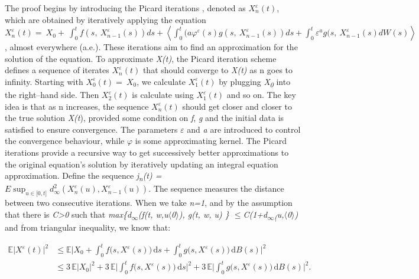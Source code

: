 \documentclass[12pt,a4paper]{report}
\numberwithin{equation}{section}
\begin{document}
The proof begins by introducing the Picard iterations \cite{llendeto2007modeling_82}, denoted
as \(X_{n}^{\varepsilon}(t)\), which are obtained by iteratively
applying the equation
\(X_{n}^{\varepsilon}(t) = \ X_{0} + \ \int_{0}^{t}{f\left( s,\ X_{n - 1}^{\varepsilon}(s) \right)ds + \left\langle \int_{0}^{t}{(a\varphi^{\varepsilon}(s)g\left( s,\ X_{n - 1}^{\varepsilon}(s) \right)ds + \int_{0}^{t}{\varepsilon^{a}g(s,\ X_{n - 1}^{\varepsilon}(s)
dW(s)}} \right\rangle}\),
almost everywhere (a.e.). These iterations aim to find an approximation
for the solution of the equation. To approximate \emph{X(t)}, the Picard
iteration scheme defines a sequence of iterates
\(X_{n}^{\varepsilon}(t)\) that should converge to \emph{X(t)} as n goes
to infinity. Starting with \(X_{0}^{\varepsilon}(t) = \ X_{0}\), we
calculate \(X_{1}^{\varepsilon}(t)\) by plugging
\emph{X\textsubscript{0}} into the right--hand side. Then
\(X_{2}^{\varepsilon}(t)\) is calculate using \(X_{1}^{\varepsilon}(t)\)
and so on. The key idea is that as n increases, the sequence
\(X_{n}^{\varepsilon}(t)\) should get closer and closer to the true
solution \emph{X(t}), provided some condition on \emph{f}, \emph{g} and
the initial data is satisfied to ensure convergence. The parameters
\emph{$\varepsilon$} and \emph{a} are introduced to control the convergence
behaviour, while \emph{$\varphi$} is some approximating kernel. The Picard
iterations provide a recursive way to get successively better
approximations to the original equation's solution by iteratively
updating an integral equation approximation. Define the sequence
\emph{j\textsubscript{n}(t) =}
\(E\sup_{u \in \lbrack 0,t\rbrack}{d_{\infty}^{2}(X_{n}^{\varepsilon}(u),X_{n - 1}^{\varepsilon}(u))}\)\emph{.}
The sequence measures the distance between two consecutive iterations.
When we take \emph{n=1}, and by the assumption that there is
\emph{C\textgreater0} such that \emph{max\{d\textsubscript{$\infty$}(f(t,
w,u$\langle$0$\rangle$), \textbar g(t, w, u)\textbar{} \}
$\leq$C(1+d\textsubscript{$\infty$(}u,$\langle$0$\rangle$)} and from triangular inequality,
we know that:

\[
\begin{aligned}
\mathbb{E}\bigl|X^{\varepsilon}(t)\bigr|^{2}
&\le \mathbb{E}\Biggl|X_{0}
+ \int_{0}^{t} f\bigl(s,X^{\varepsilon}(s)\bigr)\,\mathrm{d}s
+ \int_{0}^{t} g\bigl(s,X^{\varepsilon}(s)\bigr)\,\mathrm{d}B(s)\Biggr|^{2} \\
&\le 3\,\mathbb{E}|X_{0}|^{2}
+ 3\,\mathbb{E}\Biggl|\int_{0}^{t} f\bigl(s,X^{\varepsilon}(s)\bigr)\,\mathrm{d}s\Biggr|^{2}
+ 3\,\mathbb{E}\Biggl|\int_{0}^{t} g\bigl(s,X^{\varepsilon}(s)\bigr)\,\mathrm{d}B(s)\Biggr|^{2}.
\end{aligned}
\]
\end{document}
